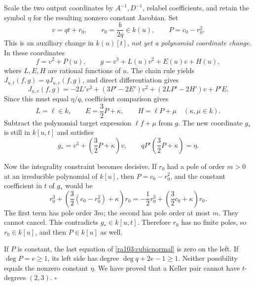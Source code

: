 \documentclass[11pt]{article}
\begin{document}
Scale the two output coordinates by $A^{-1},D^{-1}$, relabel coefficients,
and retain the symbol $\eta$ for the resulting nonzero constant Jacobian.
Set
\[
 v=qt+r_0,\qquad r_0=\frac{b}{2q}\in k(u),\qquad
 P=c_0-r_0^2.
\]
This is an auxiliary change in $k(u)[t]$, \emph{not yet a polynomial
coordinate change}. In these coordinates
\[
 f=v^2+P(u),\qquad
 g=v^3+L(u)v^2+E(u)v+H(u),
\]
where $L,E,H$ are rational functions of $u$. The chain rule yields
$J_{u,t}(f,g)=qJ_{u,v}(f,g)$, and direct differentiation gives
\begin{equation}\label{ra103:cubiccompare}
 J_{u,v}(f,g)=
 -2L'v^3+(3P'-2E')v^2+(2LP'-2H')v+P'E.
\end{equation}
Since this must equal $\eta/q$, coefficient comparison gives
\[
 L=\ell\in k,\qquad E=\frac32P+\kappa,\qquad
 H=\ell P+\mu\quad(\kappa,\mu\in k).
\]
Subtract the polynomial target expression $\ell f+\mu$ from $g$. The new
coordinate $g_*$ is still in $k[u,t]$ and satisfies
\begin{equation}\label{ra103:cubicnormal}
 g_*=v^3+\left(\frac32P+\kappa\right)v,
 \qquad qP'\left(\frac32P+\kappa\right)=\eta.
\end{equation}

Now the integrality constraint becomes decisive. If $r_0$ had a pole of
order $m>0$ at an irreducible polynomial of $k[u]$, then
$P=c_0-r_0^2$, and the constant coefficient in $t$ of $g_*$ would be
\begin{equation}\label{ra103:pole}
 r_0^3+\left(\frac32(c_0-r_0^2)+\kappa\right)r_0
 =-\frac12r_0^3+\left(\frac32c_0+\kappa\right)r_0.
\end{equation}
The first term has pole order $3m$; the second has pole order at most $m$.
They cannot cancel. This contradicts $g_*\in k[u,t]$. Therefore $r_0$ has
no finite poles, so $r_0\in k[u]$, and then $P\in k[u]$ as well.

If $P$ is constant, the last equation of \eqref{ra103:cubicnormal} is zero
on the left. If $\deg P=e\ge1$, its left side has degree
$\deg q+2e-1\ge1$. Neither possibility equals the nonzero constant $\eta$.
We have proved that a Keller pair cannot have $t$-degrees $(2,3)$.
\hfill$\square$
\end{document}
